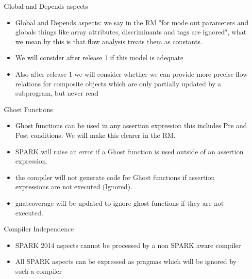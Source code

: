 \documentclass{beamer}
\begin{document}
\begin{frame}{Global and Depends aspects}

  \begin{itemize}

  \item Global and Depends aspects: we say in the RM "for mode out
    parameters and globals things like array attributes,
    discriminants and tags are ignored", what we mean by this is
    that flow analysis treats them as constants.
  \item We will consider after release 1 if this model is adequate
  \item Also after release 1 we will consider whether we can provide more
  precise flow relations for composite objects which are only
  partially updated by a subprogram, but never read
  \end{itemize}

\end{frame}

\begin{frame}{Ghost Functions}

  \begin{itemize}

  \item Ghost functions can be used in any assertion expression this
    includes Pre and Post conditions.  We will make this clearer in the
    RM.
  \item SPARK will raise an error if a Ghost
    function is used outside of an assertion expression.  
  \item the compiler will not generate
    code for Ghost functions if assertion expressions are not executed
    (Ignored).
  \item gnatcoverage will be updated to ignore ghost functions if
    they are not executed.
 \end{itemize}

\end{frame}

\begin{frame}{Compiler Independence}

  \begin{itemize}

  \item SPARK 2014 aspects cannot be processed by a non SPARK aware compiler  
  \item All SPARK aspects can be expressed as pragmas which will be
    ignored by such a compiler
 \end{itemize}

\end{frame}
\end{document}
